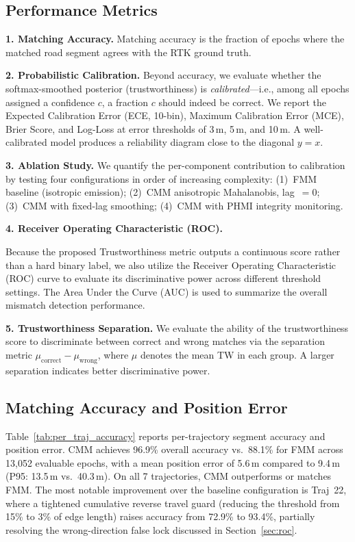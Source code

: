 \documentclass[letterpaper,journal]{IEEEtran}
\begin{document}
\subsection{Performance Metrics}
\textbf{1. Matching Accuracy.}
Matching accuracy is the fraction of epochs where the matched road segment
agrees with the RTK ground truth.

\textbf{2. Probabilistic Calibration.}
Beyond accuracy, we evaluate whether the softmax-smoothed posterior
(trustworthiness) is \emph{calibrated}—i.e., among all epochs assigned
a confidence $c$, a fraction $c$ should indeed be correct.
We report the Expected Calibration Error (ECE, 10-bin), Maximum
Calibration Error (MCE), Brier Score, and Log-Loss at error thresholds of
3\,m, 5\,m, and 10\,m. A well-calibrated model produces a reliability
diagram close to the diagonal $y=x$.

\textbf{3. Ablation Study.}
We quantify the per-component contribution to calibration by testing four
configurations in order of increasing complexity:
(1)~FMM baseline (isotropic emission);
(2)~CMM anisotropic Mahalanobis, lag~$=0$;
(3)~CMM with fixed-lag smoothing;
(4)~CMM with PHMI integrity monitoring.

\textbf{4. Receiver Operating Characteristic (ROC).}

Because the proposed Trustworthiness metric outputs a continuous score rather than a hard binary label, we also utilize the Receiver Operating Characteristic (ROC) curve to evaluate its discriminative power across different threshold settings. The Area Under the Curve (AUC) is used to summarize the overall mismatch detection performance.

\textbf{5. Trustworthiness Separation.}
We evaluate the ability of the trustworthiness score to discriminate between correct and wrong matches via the separation metric $\mu_{\text{correct}} - \mu_{\text{wrong}}$, where $\mu$ denotes the mean TW in each group. A larger separation indicates better discriminative power.

\subsection{Matching Accuracy and Position Error}
\label{sec:accuracy}

Table~\ref{tab:per_traj_accuracy} reports per-trajectory segment accuracy and position error. CMM achieves 96.9\% overall accuracy vs.\ 88.1\% for FMM across 13,052 evaluable epochs, with a mean position error of 5.6\,m compared to 9.4\,m (P95: 13.5\,m vs.\ 40.3\,m). On all 7 trajectories, CMM outperforms or matches FMM. The most notable improvement over the baseline configuration is Traj~22, where a tightened cumulative reverse travel guard (reducing the threshold from 15\% to 3\% of edge length) raises accuracy from 72.9\% to 93.4\%, partially resolving the wrong-direction false lock discussed in Section~\ref{sec:roc}.
\end{document}
